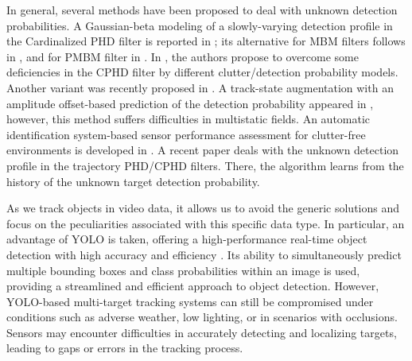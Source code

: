 In general, several methods have been proposed to deal with unknown detection probabilities. A Gaussian-beta modeling of a slowly-varying detection profile in the Cardinalized PHD filter is reported in \cite{Mahler2011cphd}; its alternative for MBM filters follows in \cite{Vo2013Robust}, and for PMBM filter in \cite{Kong2021Robust}. In \cite{Li2018PHD}, the authors propose to overcome some deficiencies in the CPHD filter \cite{Mahler2011cphd} by different clutter/detection probability models. Another variant was recently proposed in \cite{wei2023BGMPHD}. A track-state augmentation with an amplitude offset-based prediction of the detection probability appeared in \cite{Hanusa2013Track}, however, this method suffers difficulties in multistatic fields. An automatic identification system-based sensor performance assessment for clutter-free environments is developed in \cite{Horn2013Near}. A recent paper \cite{Wei2022Trajectory} deals with the unknown detection profile in the trajectory PHD/CPHD filters. There, the algorithm learns from the history of the unknown target detection probability.

As we track objects in video data, it allows us to avoid the generic solutions and focus on the peculiarities
associated with this specific data type. In particular, an advantage of YOLO is taken, offering a high-performance
real-time object detection with high accuracy and efficiency \cite{yanYolo2023}. Its ability to simultaneously
predict multiple bounding boxes and class probabilities within an image is used, providing a streamlined and
efficient approach to object detection. However, YOLO-based multi-target tracking systems can still be compromised
under conditions such as adverse weather, low lighting, or in scenarios with occlusions. Sensors may encounter difficulties in accurately detecting and localizing targets, leading to gaps or errors in the tracking process.

